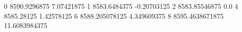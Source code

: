 0 8590.9296875 7.07421875
1 8583.6484375 -0.20703125
2 8583.85546875 0.0
4 8585.28125 1.42578125
6 8588.205078125 4.349609375
8 8595.4638671875 11.6083984375
